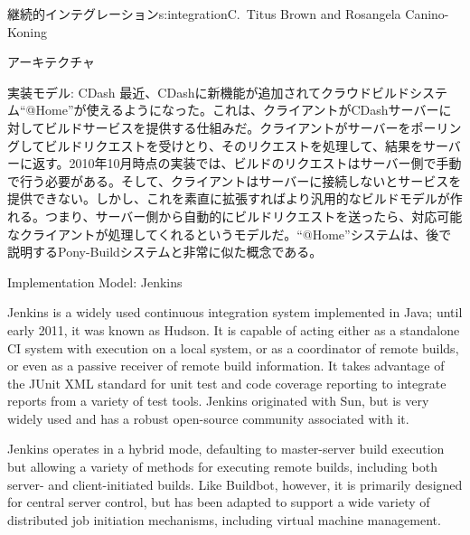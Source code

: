\begin{aosachapter}{継続的インテグレーション}{s:integration}{C.\ Titus Brown and Rosangela Canino-Koning}
\begin{aosasect1}{アーキテクチャ}
\begin{aosasect2}{実装モデル: CDash}
最近、CDashに新機能が追加されてクラウドビルドシステム``@Home''が使えるようになった。これは、クライアントがCDashサーバーに対してビルドサービスを提供する仕組みだ。クライアントがサーバーをポーリングしてビルドリクエストを受けとり、そのリクエストを処理して、結果をサーバーに返す。2010年10月時点の実装では、ビルドのリクエストはサーバー側で手動で行う必要がある。そして、クライアントはサーバーに接続しないとサービスを提供できない。しかし、これを素直に拡張すればより汎用的なビルドモデルが作れる。つまり、サーバー側から自動的にビルドリクエストを送ったら、対応可能なクライアントが処理してくれるというモデルだ。``@Home''システムは、後で説明するPony-Buildシステムと非常に似た概念である。

\end{aosasect2}

\begin{aosasect2}{Implementation Model: Jenkins}

Jenkins is a widely used continuous integration system implemented in
Java; until early 2011, it was known as Hudson. It is capable of
acting either as a standalone CI system with execution on a local
system, or as a coordinator of remote builds, or even as a passive
receiver of remote build information. It takes advantage of the JUnit
XML standard for unit test and code coverage reporting to integrate
reports from a variety of test tools. Jenkins originated with Sun, but
is very widely used and has a robust open-source community associated
with it.

Jenkins operates in a hybrid mode, defaulting to master-server build
execution but allowing a variety of methods for executing remote
builds, including both server- and client-initiated builds. Like
Buildbot, however, it is primarily designed for central server
control, but has been adapted to support a wide variety of distributed
job initiation mechanisms, including virtual machine management.


\end{aosasect2}
\end{aosasect1}
\end{aosachapter}

